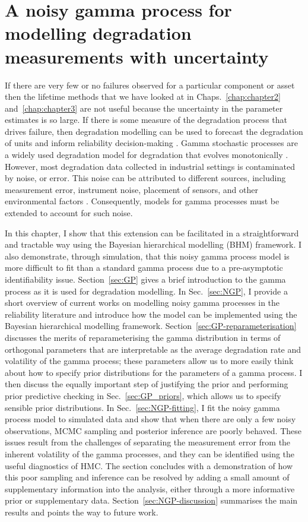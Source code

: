 \chapter{A noisy gamma process for modelling degradation measurements with uncertainty}\label{chap:chapter4}

If there are very few or no failures observed for a particular component or asset then the lifetime methods that we have looked at in Chaps.~\ref{chap:chapter2} and~\ref{chap:chapter3} are not useful because the uncertainty in the parameter estimates is so large. If there is some measure of the degradation process that drives failure, then degradation modelling can be used to forecast the degradation of units and inform reliability decision-making \citep{hamada_2008}. Gamma stochastic processes are a widely used degradation model for degradation that evolves monotonically \citep{lawless2004}. However, most degradation data collected in industrial settings is contaminated by noise, or error. This noise can be attributed to different sources, including measurement error, instrument noise, placement of sensors, and other environmental factors \citep{ye2015}. Consequently, models for gamma processes must be extended to account for such noise.

In this chapter, I show that this extension can be facilitated in a straightforward and tractable way using the Bayesian hierarchical modelling (BHM) framework. I also demonstrate, through simulation, that this noisy gamma process model is more difficult to fit than a standard gamma process due to a pre-asymptotic identifiability issue. Section~\ref{sec:GP} gives a brief introduction to the gamma process as it is used for degradation modelling. In Sec.~\ref{sec:NGP}, I provide a short overview of current works on modelling noisy gamma processes in the reliability literature and introduce how the model can be implemented using the Bayesian hierarchical modelling framework. Section~\ref{sec:GP-reparameterisation} discusses the merits of reparameterising the gamma distribution in terms of orthogonal parameters that are interpretable as the average degradation rate and volatility of the gamma process; these parameters allow us to more easily think about how to specify prior distributions for the parameters of a gamma process. I then discuss the equally important step of justifying the prior and performing prior predictive checking in Sec.~\ref{sec:GP_priors}, which allows us to specify sensible prior distributions. In Sec.~\ref{sec:NGP-fitting}, I fit the noisy gamma process model to simulated data and show that when there are only a few noisy observations, MCMC sampling and posterior inference are poorly behaved. These issues result from the challenges of separating the measurement error from the inherent volatility of the gamma processes, and they can be identified using the useful diagnostics of HMC. The section concludes with a demonstration of how this poor sampling and inference can be resolved by adding a small amount of supplementary information into the analysis, either through a more informative prior or supplementary data. Section~\ref{sec:NGP-discussion} summarises the main results and points the way to future work.

